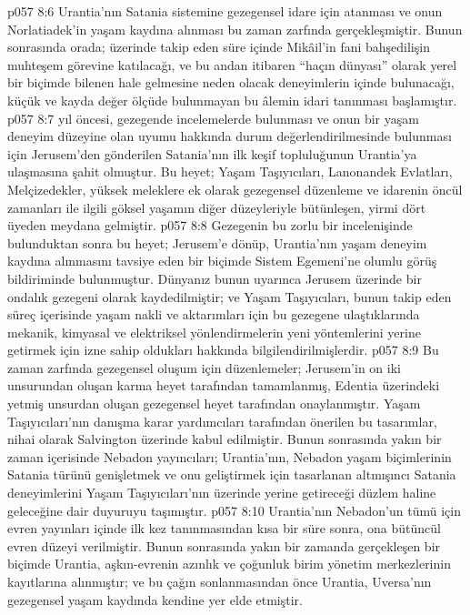 \vs p057 8:6 Urantia’nın Satania sistemine gezegensel idare için atanması ve onun Norlatiadek’in yaşam kaydına alınması bu zaman zarfında gerçekleşmiştir. Bunun sonrasında orada; üzerinde takip eden süre içinde Mikâil’in fani bahşedilişin muhteşem görevine katılacağı, ve bu andan itibaren “haçın dünyası” olarak yerel bir biçimde bilenen hale gelmesine neden olacak deneyimlerin içinde bulunacağı, küçük ve kayda değer ölçüde bulunmayan bu âlemin idari tanınması başlamıştır.
\vs p057 8:7  yıl öncesi, gezegende incelemelerde bulunması ve onun bir yaşam deneyim düzeyine olan uyumu hakkında durum değerlendirilmesinde bulunması için Jerusem’den gönderilen Satania’nın ilk keşif topluluğunun Urantia’ya ulaşmasına şahit olmuştur. Bu heyet; Yaşam Taşıyıcıları, Lanonandek Evlatları, Melçizedekler, yüksek meleklere ek olarak gezegensel düzenleme ve idarenin öncül zamanları ile ilgili göksel yaşamın diğer düzeyleriyle bütünleşen, yirmi dört üyeden meydana gelmiştir.
\vs p057 8:8 Gezegenin bu zorlu bir incelenişinde bulunduktan sonra bu heyet; Jerusem’e dönüp, Urantia’nın yaşam deneyim kaydına alınmasını tavsiye eden bir biçimde Sistem Egemeni’ne olumlu görüş bildiriminde bulunmuştur. Dünyanız bunun uyarınca Jerusem üzerinde bir ondalık gezegeni olarak kaydedilmiştir; ve Yaşam Taşıyıcıları, bunun takip eden süreç içerisinde yaşam nakli ve aktarımları için bu gezegene ulaştıklarında mekanik, kimyasal ve elektriksel yönlendirmelerin yeni yöntemlerini yerine getirmek için izne sahip oldukları hakkında bilgilendirilmişlerdir.
\vs p057 8:9 Bu zaman zarfında gezegensel oluşum için düzenlemeler; Jerusem’in on iki unsurundan oluşan karma heyet tarafından tamamlanmış, Edentia üzerindeki yetmiş unsurdan oluşan gezegensel heyet tarafından onaylanmıştır. Yaşam Taşıyıcıları’nın danışma karar yardımcıları tarafından önerilen bu tasarımlar, nihai olarak Salvington üzerinde kabul edilmiştir. Bunun sonrasında yakın bir zaman içerisinde Nebadon yayıncıları; Urantia’nın, Nebadon yaşam biçimlerinin Satania türünü genişletmek ve onu geliştirmek için tasarlanan altmışıncı Satania deneyimlerini Yaşam Taşıyıcıları’nın üzerinde yerine getireceği düzlem haline geleceğine dair duyuruyu taşımıştır.
\vs p057 8:10 Urantia’nın Nebadon’un tümü için evren yayınları içinde ilk kez tanınmasından kısa bir süre sonra, ona bütüncül evren düzeyi verilmiştir. Bunun sonrasında yakın bir zamanda gerçekleşen bir biçimde Urantia, aşkın\hyp{}evrenin azınlık ve çoğunluk birim yönetim merkezlerinin kayıtlarına alınmıştır; ve bu çağın sonlanmasından önce Urantia, Uversa’nın gezegensel yaşam kaydında kendine yer elde etmiştir.
